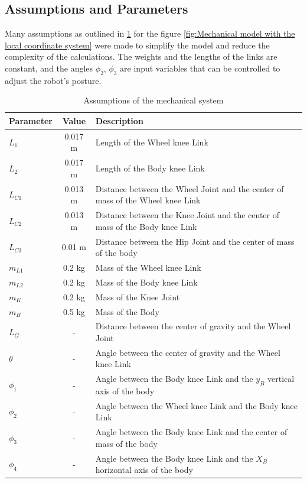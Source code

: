 \subsection{Assumptions and Parameters}
Many assumptions as outlined in \ref{tab:assumptions} for the figure \ref{fig:Mechanical model with the local coordinate system} were made to simplify the model and reduce the complexity of the calculations. The weights and the lengths of the links are constant, and the angles $\phi_2$, $\phi_3$ are input variables that can be controlled to adjust the robot's posture.
	\begin{table}[h!]
		\centering
		\caption{Assumptions of the mechanical system}
		\label{tab:assumptions}
		\begin{tabular}{lcl}
			\toprule
			Parameter & Value & Description \\
			\midrule
			$L_1$ & 0.017 m & Length of the Wheel knee Link \\
			$L_2$ & 0.017 m & Length of the Body knee Link \\
			$L_{C1}$ & 0.013 m & Distance between the Wheel Joint and the center of mass of the Wheel knee Link \\
			$L_{C2}$ & 0.013 m & Distance between the Knee Joint and the center of mass of the Body knee Link \\
			$L_{C3}$ & 0.01 m & Distance between the Hip Joint and the center of mass of the body \\
			$m_{L1}$ & 0.2 kg & Mass of the Wheel knee Link \\
			$m_{L2}$ & 0.2 kg & Mass of the Body knee Link \\
			$m_K$ & 0.2 kg & Mass of the Knee Joint \\
			$m_B$ & 0.5 kg & Mass of the Body \\
			$L_G$ & - & Distance between the center of gravity and the Wheel Joint \\
			$\theta$ & - & Angle between the center of gravity and the Wheel knee Link \\
			$\phi_1$ & - & Angle between the Body knee Link and the $y_B$ vertical axis of the body \\
			$\phi_2$ & - & Angle between the Wheel knee Link and the Body knee Link \\
			$\phi_3$ & - & Angle between the Body knee Link and the center of mass of the body \\
			$\phi_4$ & - & Angle between the Body knee Link and the $X_B$ horizontal axis of the body \\

\end{tabular}
\end{table}
